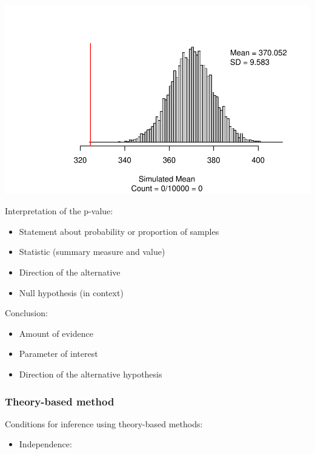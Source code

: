 \documentclass[
]{report}
\providecommand{\tightlist}{%
  \setlength{\itemsep}{0pt}\setlength{\parskip}{0pt}}
\begin{document}
\begin{center}\includegraphics[width=0.6\linewidth]{06-VN06-EDAonemeanSim_files/figure-latex/unnamed-chunk-14-1} \end{center}

\newpage

Interpretation of the p-value:

\begin{itemize}
\item
  Statement about probability or proportion of samples
\item
  Statistic (summary measure and value)
\item
  Direction of the alternative
\item
  Null hypothesis (in context)
\end{itemize}

\vspace{0.8in}

Conclusion:

\begin{itemize}
\item
  Amount of evidence
\item
  Parameter of interest
\item
  Direction of the alternative hypothesis
\end{itemize}

\vspace{0.8in}

\subsubsection*{Theory-based method}\label{theory-based-method-1}

Conditions for inference using theory-based methods:

\begin{itemize}
\tightlist
\item
  Independence:
\end{itemize}
\end{document}
